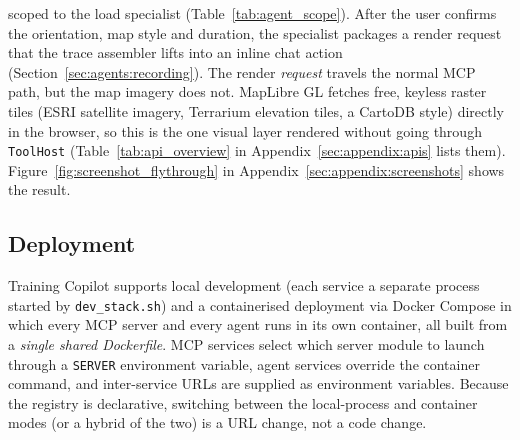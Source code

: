 scoped to the load specialist (Table~\ref{tab:agent_scope}). After the user confirms the orientation, map style and duration, the specialist packages a render request that the trace assembler lifts into an inline chat action (Section~\ref{sec:agents:recording}). The render \textit{request} travels the normal MCP path, but the map imagery does not. MapLibre GL fetches free, keyless raster tiles (ESRI satellite imagery, Terrarium elevation tiles, a CartoDB style) directly in the browser, so this is the one visual layer rendered without going through \texttt{ToolHost} (Table~\ref{tab:api_overview} in Appendix~\ref{sec:appendix:apis} lists them). Figure~\ref{fig:screenshot_flythrough} in Appendix~\ref{sec:appendix:screenshots} shows the result.

\subsection{Deployment}\label{sec:architecture:deployment}

Training Copilot supports local development (each service a separate process started by \texttt{dev\_stack.sh}) and a containerised deployment via Docker Compose in which every MCP server and every agent runs in its own container, all built from a \textit{single shared Dockerfile}. MCP services select which server module to launch through a \texttt{SERVER} environment variable, agent services override the container command, and inter-service URLs are supplied as environment variables. Because the registry is declarative, switching between the local-process and container modes (or a hybrid of the two) is a URL change, not a code change.
